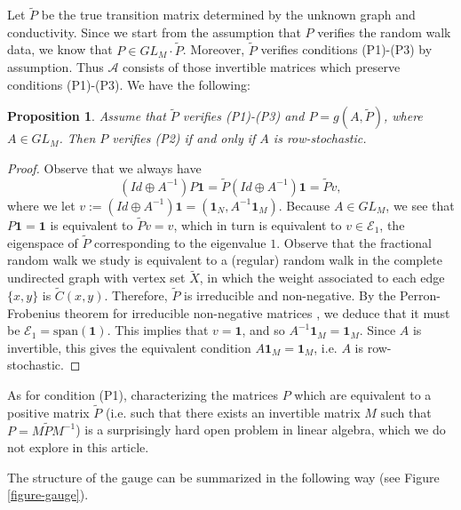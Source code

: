 \documentclass[a4paper,11pt,oneside]{amsart}
\newtheorem{proposition}[theorem]{Proposition}
\begin{document}
Let $\tilde P$ be the true transition matrix determined by the unknown graph and conductivity. Since we start from the assumption that $P$ verifies the random walk data, we know that $P\in GL_M\cdot\tilde P$. Moreover, $\tilde P$ verifies conditions (P1)-(P3) by assumption. Thus $\mathcal A$ consists of those invertible matrices which preserve conditions (P1)-(P3). We have the following:

\begin{proposition}\label{prop:char-P2}
    Assume that $\tilde P$ verifies (P1)-(P3) and $P= g(A,\tilde P)$, where $A\in GL_M$. Then $P$ verifies (P2) if and only if $A$ is row-stochastic.
\end{proposition}

\begin{proof}
    Observe that we always have
    $$(Id \oplus A^{-1})P\mathbf 1 = \tilde P(Id\oplus A^{-1})\mathbf 1 = \tilde P v,$$
    where we let $v:= (Id\oplus A^{-1})\mathbf 1 = (\mathbf 1_N, A^{-1}\mathbf 1_M)$. Because $A\in GL_M$, we see that $P\mathbf 1 = \mathbf 1$ is equivalent to $\tilde P v = v$, which in turn is equivalent to $v\in\mathcal E_1$, the eigenspace of $\tilde P$ corresponding to the eigenvalue $1$. Observe that the fractional random walk we study is equivalent to a (regular) random walk in the complete undirected graph with vertex set $\widetilde X$, in which the weight associated to each edge $\{x,y\}$ is $\widetilde C(x,y)$. Therefore, $\tilde P$ is irreducible and non-negative. By the Perron-Frobenius theorem for irreducible non-negative matrices \cite[Theorem 8.4.4]{HJ12}, we deduce that it must be $\mathcal E_1 = \mbox{span}(\mathbf 1)$. This implies that $v=\mathbf 1$, and so $A^{-1}\mathbf 1_M = \mathbf 1_M$. Since $A$ is invertible, this gives the equivalent condition $A \mathbf 1_{M} = \mathbf 1_{M}$, i.e. $A$ is row-stochastic.
\end{proof}

As for condition (P1), characterizing the matrices $P$ which are equivalent to a positive matrix $\tilde P$ (i.e. such that there exists an invertible matrix $M$ such that $P=M\tilde PM^{-1}$) is a surprisingly hard open problem in linear algebra, which we do not explore in this article. 

The structure of the gauge can be summarized in the following way (see Figure \ref{figure-gauge}). 
\end{document}
